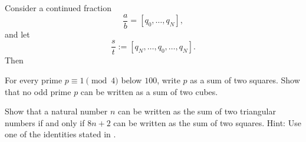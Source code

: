 \begin{noteblock}
\begin{theorem}
  Consider a continued fraction
  \begin{equation*}
    \frac{a}{b} = [q_0,\ldots,q_N],
  \end{equation*}
  and let
  \begin{equation*}
    \frac{s}{t} := [q_N,\ldots,q_0,\ldots,q_N].
  \end{equation*}
  Then
\end{theorem}
\end{noteblock}

\exercises

\begin{starter}
  \exercise For every prime $p\equiv 1\pmod{4}$ below $100$, write $p$ as a sum of two squares.
  \exercise Show that no odd prime $p$ can be written as a sum of two cubes.
\end{starter}

\begin{routine}
  \exercise Show that a natural number $n$ can be written as the sum of two triangular numbers if and only if $8n+2$ can be written as the sum of two squares. Hint: Use one of the identities stated in .
\end{routine}


